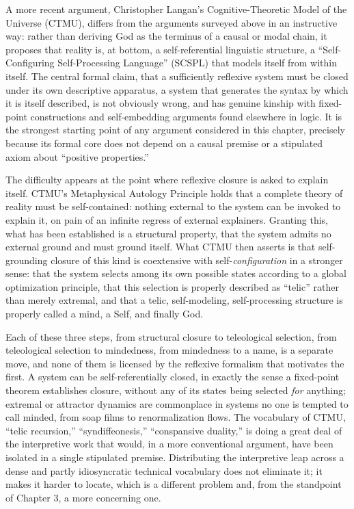 \documentclass[11pt]{book}
\begin{document}
A more recent argument, Christopher Langan's Cognitive-Theoretic Model of the Universe (CTMU), differs from the arguments surveyed above in an instructive way: rather than deriving God as the terminus of a causal or modal chain, it proposes that reality is, at bottom, a self-referential linguistic structure, a ``Self-Configuring Self-Processing Language'' (SCSPL) that models itself from within itself. The central formal claim, that a sufficiently reflexive system must be closed under its own descriptive apparatus, a system that generates the syntax by which it is itself described, is not obviously wrong, and has genuine kinship with fixed-point constructions and self-embedding arguments found elsewhere in logic. It is the strongest starting point of any argument considered in this chapter, precisely because its formal core does not depend on a causal premise or a stipulated axiom about ``positive properties.''

The difficulty appears at the point where reflexive closure is asked to explain itself. CTMU's Metaphysical Autology Principle holds that a complete theory of reality must be self-contained: nothing external to the system can be invoked to explain it, on pain of an infinite regress of external explainers. Granting this, what has been established is a structural property, that the system admits no external ground and must ground itself. What CTMU then asserts is that self-grounding closure of this kind is coextensive with self-\emph{configuration} in a stronger sense: that the system selects among its own possible states according to a global optimization principle, that this selection is properly described as ``telic'' rather than merely extremal, and that a telic, self-modeling, self-processing structure is properly called a mind, a Self, and finally God.

Each of these three steps, from structural closure to teleological selection, from teleological selection to mindedness, from mindedness to a name, is a separate move, and none of them is licensed by the reflexive formalism that motivates the first. A system can be self-referentially closed, in exactly the sense a fixed-point theorem establishes closure, without any of its states being selected \emph{for} anything; extremal or attractor dynamics are commonplace in systems no one is tempted to call minded, from soap films to renormalization flows. The vocabulary of CTMU, ``telic recursion,'' ``syndiffeonesis,'' ``conspansive duality,'' is doing a great deal of the interpretive work that would, in a more conventional argument, have been isolated in a single stipulated premise. Distributing the interpretive leap across a dense and partly idiosyncratic technical vocabulary does not eliminate it; it makes it harder to locate, which is a different problem and, from the standpoint of Chapter 3, a more concerning one.
\end{document}
